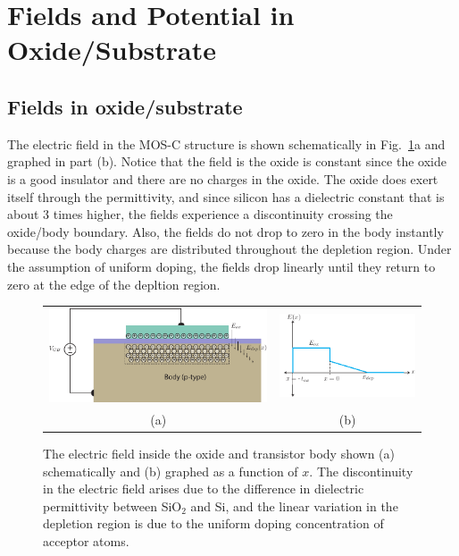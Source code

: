 \section{Fields and Potential in Oxide/Substrate}


\subsection{Fields in oxide/substrate}

The electric field in the MOS-C structure is shown schematically in Fig.~\ref{fig:mos_field_oxide_semi}a and graphed in part (b).  Notice that the field is the oxide is constant since the oxide is a good insulator and there are no charges in the oxide.  The oxide does exert itself through the permittivity, and since silicon has a dielectric constant that is about 3 times higher, the fields experience a discontinuity crossing the oxide/body boundary.  Also, the fields do not drop to zero in the body instantly because the body charges are distributed throughout the depletion region.  Under the assumption of uniform doping, the fields drop linearly until they return to zero at the edge of the depltion region.   


\begin{figure}[tbh]
\begin{center}
\begin{tabular}{cc}
\includegraphics[width=.6\columnwidth]{mos_cap_Efields} &
\includegraphics[width=.4\columnwidth]{MOS_E_field} \\
(a) & (b) \\
\end{tabular}
\end{center}
\caption{The electric field inside the oxide and transistor body shown (a) schematically and (b) graphed as a function of $x$.  The discontinuity in the electric field arises due to the difference in dielectric permittivity between SiO$_2$ and Si, and the linear variation in the depletion region is due to the uniform doping concentration of acceptor atoms.  } \label{fig:mos_field_oxide_semi}
\end{figure}






